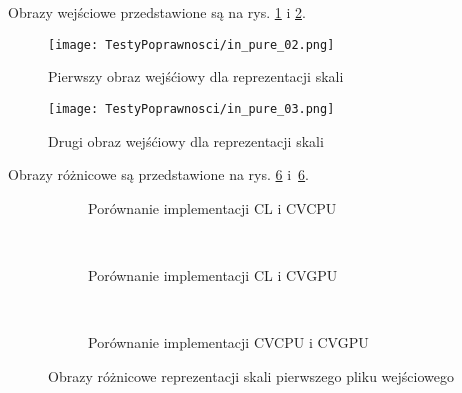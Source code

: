 Obrazy wejściowe przedstawione są na rys. \ref{fig:valPure02} i \ref{fig:valPure03}.

\begin{figure}
\begin{center}
\texttt{[image: TestyPoprawnosci/in\_pure\_02.png]}
\end{center}
\caption{Pierwszy obraz wejśćiowy dla reprezentacji skali}
\label{fig:valPure02}
\end{figure}

\begin{figure}
\begin{center}
\texttt{[image: TestyPoprawnosci/in\_pure\_03.png]}
\end{center}
\caption{Drugi obraz wejśćiowy dla reprezentacji skali}
\label{fig:valPure03}
\end{figure}

Obrazy różnicowe są przedstawione na rys. \ref{fig:valPure2} i~\ref{fig:valPure2}. 

\begin{figure}
\begin{subfigure}[b]{0.3\textwidth}
	\centering
	\setlength\fboxsep{0pt}
	\setlength\fboxrule{0.5pt}
	\caption{Porównanie implementacji CL i CVCPU}
	\label{fig:valPure2CLCVCPU}
\end{subfigure}
~
\begin{subfigure}[b]{0.3\textwidth}
	\centering
	\setlength\fboxsep{0pt}
	\setlength\fboxrule{0.5pt}
	\caption{Porównanie implementacji CL i CVGPU}
	\label{fig:valPure2CLCVGPU}
\end{subfigure}
~
\begin{subfigure}[b]{0.3\textwidth}
	\centering
	\setlength\fboxsep{0pt}
	\setlength\fboxrule{0.5pt}
	\caption{Porównanie implementacji CVCPU i CVGPU}
	\label{fig:valPure2CVCPUCVCPU}                 
\end{subfigure}
\caption{Obrazy różnicowe reprezentacji skali pierwszego pliku wejściowego}
\label{lena_scales}
\label{fig:valPure2}
\end{figure}

